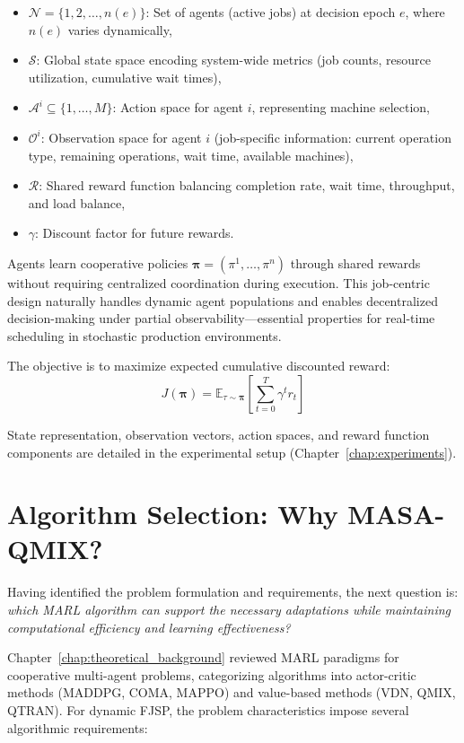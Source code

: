 \begin{itemize}
    \item \( \mathcal{N} = \{1, 2, \ldots, n(e)\} \): Set of agents (active jobs) at decision epoch \( e \), where \( n(e) \) varies dynamically,
    \item \( \mathcal{S} \): Global state space encoding system-wide metrics (job counts, resource utilization, cumulative wait times),
    \item \( \mathcal{A}^i \subseteq \{1, \ldots, M\} \): Action space for agent \( i \), representing machine selection,
    \item \( \mathcal{O}^i \): Observation space for agent \( i \) (job-specific information: current operation type, remaining operations, wait time, available machines),
    \item \( \mathcal{R} \): Shared reward function balancing completion rate, wait time, throughput, and load balance,
    \item \( \gamma \): Discount factor for future rewards.
\end{itemize}

Agents learn cooperative policies \( \boldsymbol{\pi} = (\pi^1, \ldots, \pi^n) \) through shared rewards without requiring centralized coordination during execution. This job-centric design naturally handles dynamic agent populations and enables decentralized decision-making under partial observability—essential properties for real-time scheduling in stochastic production environments.

The objective is to maximize expected cumulative discounted reward:
\[
J(\boldsymbol{\pi}) = \mathbb{E}_{\tau \sim \boldsymbol{\pi}} \left[ \sum_{t=0}^{T} \gamma^t r_t \right]
\]

State representation, observation vectors, action spaces, and reward function components are detailed in the experimental setup (Chapter~\ref{chap:experiments}).


\section{Algorithm Selection: Why MASA-QMIX?}
\label{sec:algorithm_selection}

Having identified the problem formulation and requirements, the next question is: \textit{which MARL algorithm can support the necessary adaptations while maintaining computational efficiency and learning effectiveness?}

Chapter~\ref{chap:theoretical_background} reviewed MARL paradigms for cooperative multi-agent problems, categorizing algorithms into actor-critic methods (MADDPG, COMA, MAPPO) and value-based methods (VDN, QMIX, QTRAN). For dynamic FJSP, the problem characteristics impose several algorithmic requirements:

